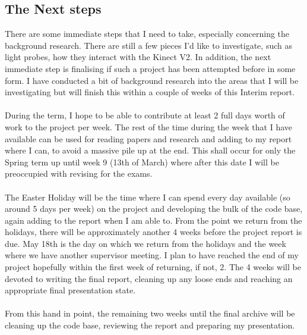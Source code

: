 \documentclass[11pt]{report}
\begin{document}
\subsection*{The Next steps}
There are some immediate steps that I need to take, especially concerning the 
background research. There are still a few pieces I'd like to investigate, such 
as light probes, how they interact with the Kinect V2. In addition, the next
immediate step is finalising if such a project has been attempted before in
some form. I have conducted a bit of background research into the areas that
I will be investigating but will finish this within a couple of weeks of this
Interim report. 
\\ \\
During the term, I hope to be able to contribute at least 2 full days worth of
work to the project per week. The rest of the time during the week that I have
available can be used for reading papers and research and adding to my report
where I can, to avoid a massive pile up at the end. This shall occur for only
the Spring term up until week 9 (13th of March) where after this date I will be
preoccupied with revising for the exams. 
\\ \\
The Easter Holiday will be the time where I can spend every day available (so
around 5 days per week) on the project and developing the bulk of the code base,
again adding to the report when I am able to. From the point we return from the
holidays, there will be approximately another 4 weeks before the project report
is due. May 18th is the day on which we return from the holidays and the week 
where we have another supervisor meeting. I plan to have reached the end of my 
project hopefully within the first week of returning, if not, 2. The 4 weeks 
will be devoted to writing the final report, cleaning up any loose ends and 
reaching an appropriate final presentation state.
\\ \\
From this hand in point, the remaining two weeks until the final archive will be
cleaning up the code base, reviewing the report and preparing my presentation.
\end{document}
